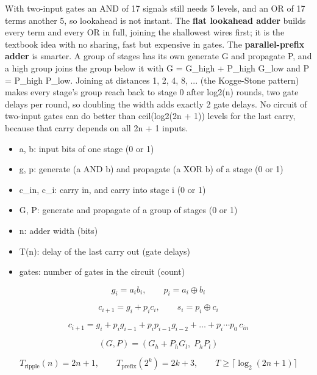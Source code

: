 \documentclass[11pt,a4paper]{article}
\begin{document}
With two-input gates an AND of 17 signals still needs 5 levels, and an OR of 17 terms another 5, so lookahead is not instant. The \textbf{flat lookahead adder} builds every term and every OR in full, joining the shallowest wires first; it is the textbook idea with no sharing, fast but expensive in gates. The \textbf{parallel-prefix adder} is smarter. A group of stages has its own generate G and propagate P, and a high group joins the group below it with G = G\_high + P\_high G\_low and P = P\_high P\_low. Joining at distances 1, 2, 4, 8, ... (the Kogge-Stone pattern) makes every stage's group reach back to stage 0 after log2(n) rounds, two gate delays per round, so doubling the width adds exactly 2 gate delays. No circuit of two-input gates can do better than ceil(log2(2n + 1)) levels for the last carry, because that carry depends on all 2n + 1 inputs.

\begin{itemize}[nosep]
\item a, b: input bits of one stage (0 or 1)
\item g, p: generate (a AND b) and propagate (a XOR b) of a stage (0 or 1)
\item c\_in, c\_i: carry in, and carry into stage i (0 or 1)
\item G, P: generate and propagate of a group of stages (0 or 1)
\item n: adder width (bits)
\item T(n): delay of the last carry out (gate delays)
\item gates: number of gates in the circuit (count)
\end{itemize}

\begin{equation*}
g_i=a_ib_i,\qquad p_i=a_i\oplus b_i
\end{equation*}

\begin{equation*}
c_{i+1}=g_i+p_ic_i,\qquad s_i=p_i\oplus c_i
\end{equation*}

\begin{equation*}
c_{i+1}=g_i+p_ig_{i-1}+p_ip_{i-1}g_{i-2}+\dots+p_i\cdots p_0\,c_{in}
\end{equation*}

\begin{equation*}
(G,P)=(G_h+P_hG_l,\;P_hP_l)
\end{equation*}

\begin{equation*}
T_{\text{ripple}}(n)=2n+1,\qquad T_{\text{prefix}}(2^k)=2k+3,\qquad T\ge\lceil\log_2(2n+1)\rceil
\end{equation*}
\end{document}
